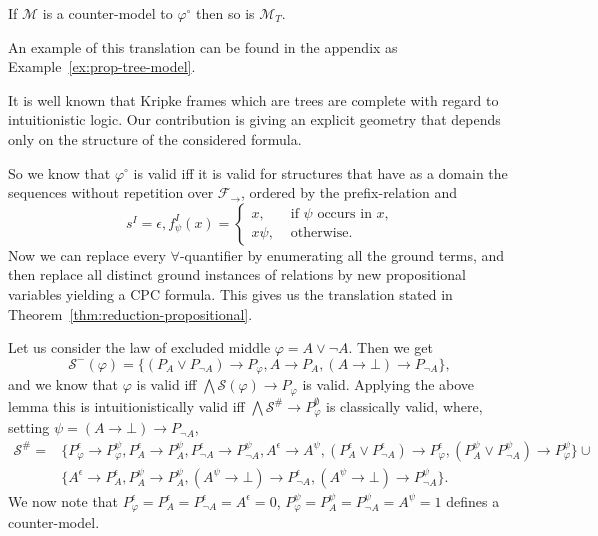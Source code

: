 \documentclass[a4paper,UKenglish,cleveref, autoref, thm-restate]{lipics-v2021}
\begin{document}
\begin{corollary}\label{cor:prop-tree-model}
	If $\mathcal M$ is a counter-model to $\varphi^\circ$ then so is $\mathcal M_T$.
\end{corollary}

An example of this translation can be found in the appendix as Example~\ref{ex:prop-tree-model}.

\begin{remark}
	It is well known that Kripke frames which are trees are complete with regard to intuitionistic logic. Our contribution is giving an explicit geometry that depends only on the structure of the considered formula.
\end{remark}


So we know that $\varphi^\circ$ is valid iff it is valid for structures that have as a domain the sequences without repetition over $\mathcal F_\to$, ordered by the prefix-relation and $$s^I = \epsilon, f_\psi^I(x) = \begin{cases}
	x, &\text{ if $\psi$ occurs in $x$,}\\
	x\psi, &\text{ otherwise.}
\end{cases}$$
Now we can replace every $\forall$-quantifier by enumerating all the ground terms, and then replace all distinct ground instances of relations by new propositional variables yielding a CPC formula. This gives us the translation stated in Theorem~\ref{thm:reduction-propositional}.

\begin{example}
	Let us consider the law of excluded middle $\varphi = A\vee\neg A$. Then we get
	$$\mathcal S^-(\varphi) = \{(P_A\vee P_{\neg A})\to P_\varphi, A\to P_A, (A\to \bot)\to P_{\neg A}\},$$
	and we know that $\varphi$ is valid iff $\bigwedge \mathcal S(\varphi)\to P_\varphi$ is valid. Applying the above lemma this is intuitionistically valid iff $\bigwedge\mathcal S^\#\to P^\emptyset_\varphi$ is classically valid, where, setting $\psi = (A\to \bot)\to P_{\neg A}$,
	\begin{align*}
		\mathcal S^\# =&\{P_\varphi^\epsilon\to P_\varphi^{\psi}, P_A^\epsilon\to P_A^{\psi},P_{\neg A}^\epsilon\to P_{\neg A}^{\psi},A^\epsilon\to A^{\psi}, (P_A^\epsilon\vee P_{\neg A}^\epsilon)\to P_\varphi^\epsilon, (P_A^{\psi}\vee P_{\neg A}^{\psi})\to P_\varphi^{\psi}\}\cup\\ &\{A^\epsilon\to P_A^\epsilon, P_A^{\psi}\to P_A^{\psi}, (A^{\psi}\to \bot)\to P_{\neg A}^\epsilon, (A^{\psi}\to \bot)\to P_{\neg A}^{\psi}\}.
	\end{align*}
	We now note that $P_\varphi^\epsilon  = P_A^\epsilon = P_{\neg A}^\epsilon = A^\epsilon = 0$, $P_{\varphi}^{\psi} = P_A^{\psi} =  P_{\neg A}^{\psi} = A^{\psi} = 1$ defines a counter-model.
\end{example}	
\end{document}
